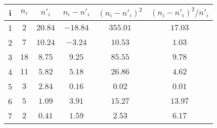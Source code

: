\begin{tabular}{|c|c|c|c|c|c|}
    \hline
    i & $n_i$ & $n'_i$ & $n_i - n'_i$ & $(n_i - n'_i)^2$ & $(n_i - n'_i)^2/n'_i$\\
    \hline
    1 & $2$ & $20.84$ & $-18.84$ & $355.01$ & $17.03$\\
    \hline
    2 & $7$ & $10.24$ & $-3.24$ & $10.53$ & $1.03$\\
    \hline
    3 & $18$ & $8.75$ & $9.25$ & $85.55$ & $9.78$\\
    \hline
    4 & $11$ & $5.82$ & $5.18$ & $26.86$ & $4.62$\\
    \hline
    5 & $3$ & $2.84$ & $0.16$ & $0.02$ & $0.01$\\
    \hline
    6 & $5$ & $1.09$ & $3.91$ & $15.27$ & $13.97$\\
    \hline
    7 & $2$ & $0.41$ & $1.59$ & $2.53$ & $6.17$\\
    \hline
\end{tabular}